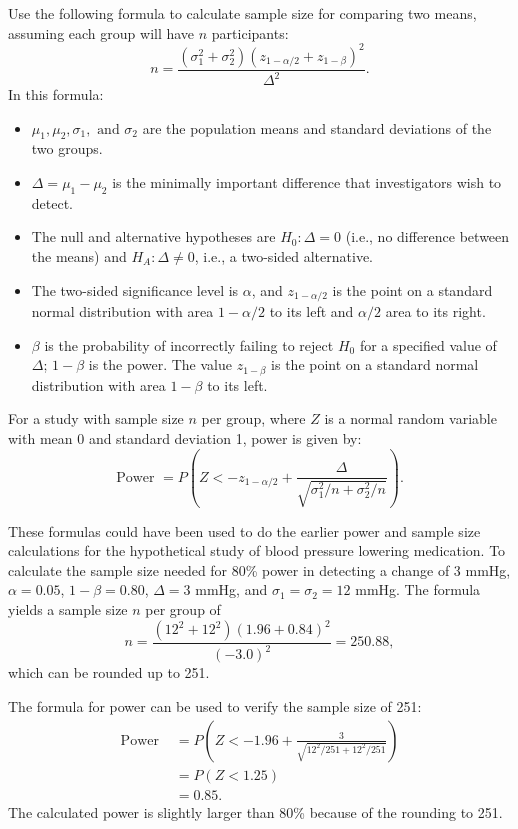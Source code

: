 Use the following formula to calculate sample size for comparing two means, assuming each group will have $n$ participants:
\[
n = \frac{(\sigma_1^2 + \sigma_2^2)( z_{1-\alpha/2} + z_{1-\beta})^2}
{\Delta^2}.
\]
In this formula: 
\begin{itemize}
\setlength{\itemsep}{0mm}
	
	\item $\mu_1, \mu_2, \sigma_1, \text{ and } \sigma_2$ are the population means and standard deviations of the two groups.
	
	\item $\Delta = \mu_1 - \mu_2$ is the minimally important difference that investigators wish to detect.
	
	\item The null and alternative hypotheses are $H_0: \Delta = 0$ (i.e., no difference between the means) and $H_A: \Delta \neq 0$, i.e., a two-sided alternative.
	
	\item The two-sided significance level is $\alpha$, and $z_{1-\alpha/2}$ is the point on a standard normal distribution with area $1-\alpha/2$ to its left and $\alpha/2$ area to its right.
	
	\item $\beta$ is the probability of incorrectly failing to reject $H_0$ for a specified value of $\Delta$; $1- \beta$ is the power.  The value $z_{1-\beta}$ is the point on a standard normal distribution with area $1 - \beta$ to its left.
\end{itemize}

\textD{\newpage}

For a study with sample size $n$ per group, where $Z$ is a normal random variable with mean 0 and standard deviation 1, power is given by:
\[
	\text{Power } = P\left(  Z <-z_{1 - \alpha/2} + \frac{\Delta}
	{\sqrt{\sigma_1^2/n + \sigma_2^2/n}}\right).
\]

These formulas could have been used to do the earlier power and sample size calculations for the hypothetical study of blood pressure lowering medication. To calculate the sample size needed for 80\% power in detecting a change of 3 mmHg, $\alpha = 0.05$, $1 - \beta = 0.80$, $\Delta = 3$ mmHg, and $\sigma_1 = \sigma_2 = 12$ mmHg. The formula yields a sample size $n$ per group of 
\[n = \frac{(12^2 + 12^2)(1.96 + 0.84)^2}{(-3.0)^2} = 250.88, \]
which can be rounded up to 251.

The formula for power can be used to verify the sample size of 251:
\begin{align*}
	\text{Power } &= P\left(Z < -1.96 + \frac{3}
	{\sqrt{12^2/251 + 12^2/251}}\right) \\
	&= P(Z < 1.25) \\
	&= 0.85.
\end{align*}
The calculated power is slightly larger than 80\% because of the rounding to 251.

